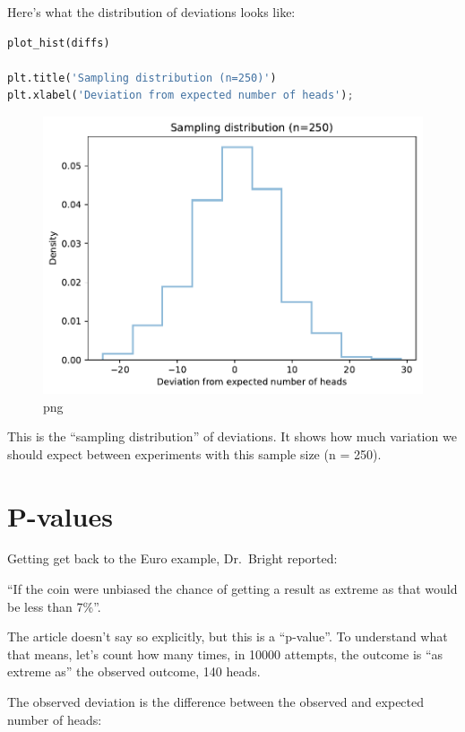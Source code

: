 Here's what the distribution of deviations looks like:

\begin{lstlisting}[language=Python]
plot_hist(diffs)

plt.title('Sampling distribution (n=250)')
plt.xlabel('Deviation from expected number of heads');
\end{lstlisting}

\begin{figure}
\centering
\includegraphics{11_inference_files/11_inference_29_0.pdf}
\caption{png}
\end{figure}

This is the ``sampling distribution'' of deviations. It shows how much
variation we should expect between experiments with this sample size (n
= 250).

\hypertarget{p-values}{%
\section{P-values}\label{p-values}}

Getting get back to the Euro example, Dr.~Bright reported:

``If the coin were unbiased the chance of getting a result as extreme as
that would be less than 7\%''.

The article doesn't say so explicitly, but this is a ``p-value''. To
understand what that means, let's count how many times, in 10000
attempts, the outcome is ``as extreme as'' the observed outcome, 140
heads.

The observed deviation is the difference between the observed and
expected number of heads:

